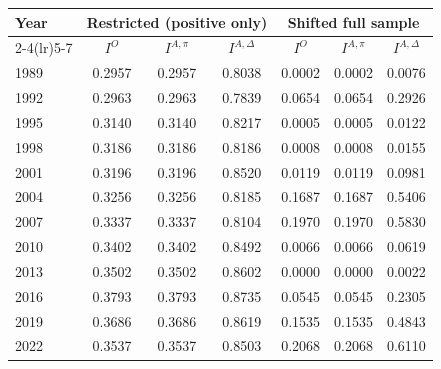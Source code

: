 \begin{tabular}{lcccccc}
\toprule
Year & \multicolumn{3}{c}{Restricted (positive only)} & \multicolumn{3}{c}{Shifted full sample} \\
\cmidrule(lr){2-4}\cmidrule(lr){5-7}
& $I^{O}$ & $I^{A,\pi}$ & $I^{A,\Delta}$ & $I^{O}$ & $I^{A,\pi}$ & $I^{A,\Delta}$ \\
\midrule
1989 & 0.2957 & 0.2957 & 0.8038 & 0.0002 & 0.0002 & 0.0076 \\
1992 & 0.2963 & 0.2963 & 0.7839 & 0.0654 & 0.0654 & 0.2926 \\
1995 & 0.3140 & 0.3140 & 0.8217 & 0.0005 & 0.0005 & 0.0122 \\
1998 & 0.3186 & 0.3186 & 0.8186 & 0.0008 & 0.0008 & 0.0155 \\
2001 & 0.3196 & 0.3196 & 0.8520 & 0.0119 & 0.0119 & 0.0981 \\
2004 & 0.3256 & 0.3256 & 0.8185 & 0.1687 & 0.1687 & 0.5406 \\
2007 & 0.3337 & 0.3337 & 0.8104 & 0.1970 & 0.1970 & 0.5830 \\
2010 & 0.3402 & 0.3402 & 0.8492 & 0.0066 & 0.0066 & 0.0619 \\
2013 & 0.3502 & 0.3502 & 0.8602 & 0.0000 & 0.0000 & 0.0022 \\
2016 & 0.3793 & 0.3793 & 0.8735 & 0.0545 & 0.0545 & 0.2305 \\
2019 & 0.3686 & 0.3686 & 0.8619 & 0.1535 & 0.1535 & 0.4843 \\
2022 & 0.3537 & 0.3537 & 0.8503 & 0.2068 & 0.2068 & 0.6110 \\
\bottomrule
\end{tabular}

